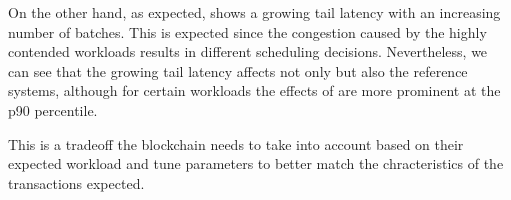 On the other hand, as expected, \sys shows a growing tail latency with an increasing number of batches. This
is expected since the congestion caused by the highly contended workloads results in different scheduling decisions. Nevertheless, we can see that the growing tail latency affects not only \sys but also the reference systems, although for certain workloads the effects of \sys are more prominent at the p90 percentile. 

This is a tradeoff the blockchain needs to take into account based on their expected workload and tune \sys parameters to better match the chracteristics of the transactions expected.











